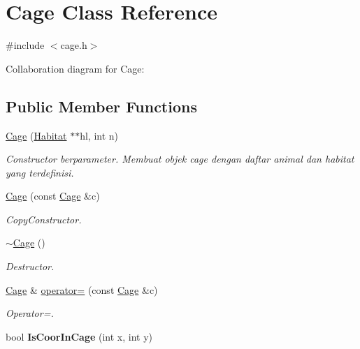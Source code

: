 \hypertarget{classCage}{}\section{Cage Class Reference}
\label{classCage}


{\ttfamily \#include $<$cage.\+h$>$}



Collaboration diagram for Cage\+:
\subsection*{Public Member Functions}
\begin{DoxyCompactItemize}
\item 
\hyperlink{classCage_a87cfc71acde51257611ce288e6337363}{Cage} (\hyperlink{classHabitat}{Habitat} $\ast$$\ast$hl, int n)
\begin{DoxyCompactList}\small\item\em Constructor berparameter. Membuat objek cage dengan daftar animal dan habitat yang terdefinisi. \end{DoxyCompactList}\item 
\hyperlink{classCage_ae85bb53517616422bf7f36282de01519}{Cage} (const \hyperlink{classCage}{Cage} \&c)\hypertarget{classCage_ae85bb53517616422bf7f36282de01519}{}\label{classCage_ae85bb53517616422bf7f36282de01519}

\begin{DoxyCompactList}\small\item\em Copy\+Constructor. \end{DoxyCompactList}\item 
\hyperlink{classCage_a657259499dfc23c63fc65aeaf8abbb17}{$\sim$\+Cage} ()\hypertarget{classCage_a657259499dfc23c63fc65aeaf8abbb17}{}\label{classCage_a657259499dfc23c63fc65aeaf8abbb17}

\begin{DoxyCompactList}\small\item\em Destructor. \end{DoxyCompactList}\item 
\hyperlink{classCage}{Cage} \& \hyperlink{classCage_a020eefd2b5d15915cf65693413be64db}{operator=} (const \hyperlink{classCage}{Cage} \&c)\hypertarget{classCage_a020eefd2b5d15915cf65693413be64db}{}\label{classCage_a020eefd2b5d15915cf65693413be64db}

\begin{DoxyCompactList}\small\item\em Operator=. \end{DoxyCompactList}\item 
bool {\bfseries Is\+Coor\+In\+Cage} (int x, int y)\hypertarget{classCage_ae9a0ca652577f2b7a3eb75d74cc68fcd}{}\label{classCage_ae9a0ca652577f2b7a3eb75d74cc68fcd}


\end{DoxyCompactItemize}
